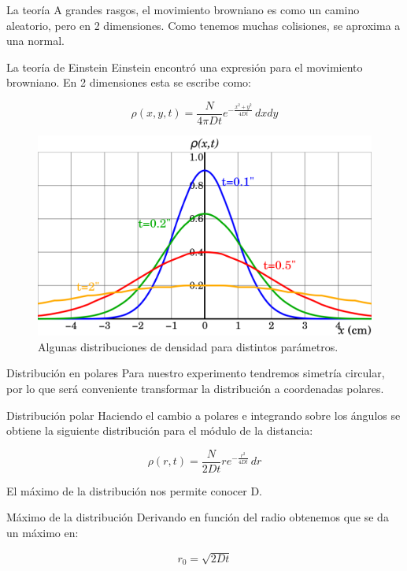 \documentclass{beamer}
\begin{document}
\begin{frame}{La teoría}
A grandes rasgos, el movimiento browniano es como un camino aleatorio, pero en 2 dimensiones. Como tenemos muchas colisiones, se aproxima a una normal.

\begin{block}{La teoría de Einstein \cite{Einstein}}
Einstein encontró una expresión para el movimiento browniano. En 2 dimensiones esta se escribe como:

\begin{equation}
\rho (x, y, t) = \frac{N}{4 \pi D t}e^{- \frac{x^2 + y^2}{4Dt}} \, dxdy
\label{eq:randomWalk}
\end{equation}
\end{block}

\begin{figure}[h!]
\begin{center}
\includegraphics[scale=0.1]{distribuciones.png}
\caption{Algunas distribuciones de densidad para distintos parámetros.}
\end{center}
\end{figure}
\end{frame}

\begin{frame}{Distribución en polares}
Para nuestro experimento tendremos simetría circular, por lo que será conveniente transformar la distribución a coordenadas polares.

\begin{block}{Distribución polar}
Haciendo el cambio a polares e integrando sobre los ángulos se obtiene la siguiente distribución para el módulo de la distancia:

\begin{equation}
\rho (r, t) = \frac{N}{2Dt} r e^{- \frac{r^2}{4Dt}} \, dr
\label{eq:distribuciónR}
\end{equation}
\end{block}

El máximo de la distribución nos permite conocer D.

\begin{block}{Máximo de la distribución}
Derivando en función del radio obtenemos que se da un máximo en:

\begin{equation}
r_0 = \sqrt{2Dt}
\label{eq:difusionMax}
\end{equation}
\end{block}
\end{frame}
\end{document}
